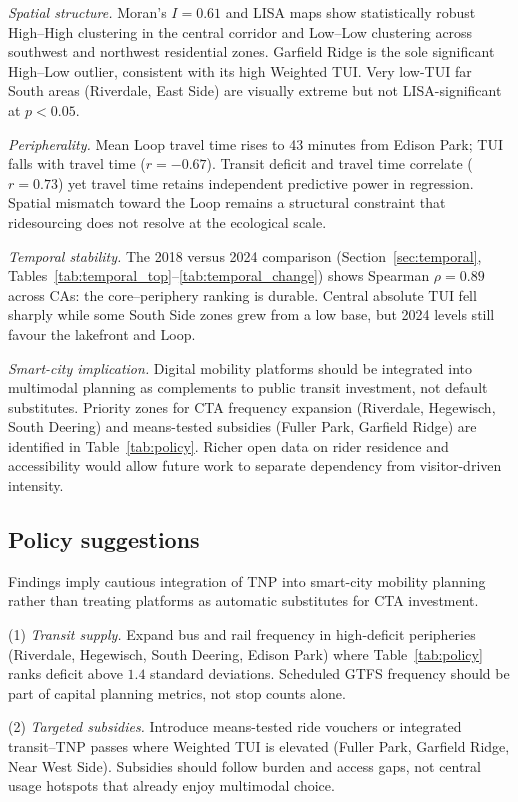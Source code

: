 \documentclass[10pt, a4paper]{article}
\begin{document}
\textit{Spatial structure.} Moran's $I=0.61$ and LISA maps show statistically robust High--High clustering in the central corridor and Low--Low clustering across southwest and northwest residential zones. Garfield Ridge is the sole significant High--Low outlier, consistent with its high Weighted TUI. Very low-TUI far South areas (Riverdale, East Side) are visually extreme but not LISA-significant at $p<0.05$.

\textit{Peripherality.} Mean Loop travel time rises to 43 minutes from Edison Park; TUI falls with travel time ($r=-0.67$). Transit deficit and travel time correlate ($r=0.73$) yet travel time retains independent predictive power in regression. Spatial mismatch toward the Loop remains a structural constraint that ridesourcing does not resolve at the ecological scale.

\textit{Temporal stability.} The 2018 versus 2024 comparison (Section~\ref{sec:temporal}, Tables~\ref{tab:temporal_top}--\ref{tab:temporal_change}) shows Spearman $\rho=0.89$ across CAs: the core--periphery ranking is durable. Central absolute TUI fell sharply while some South Side zones grew from a low base, but 2024 levels still favour the lakefront and Loop.

\textit{Smart-city implication.} Digital mobility platforms should be integrated into multimodal planning as complements to public transit investment, not default substitutes. Priority zones for CTA frequency expansion (Riverdale, Hegewisch, South Deering) and means-tested subsidies (Fuller Park, Garfield Ridge) are identified in Table~\ref{tab:policy}. Richer open data on rider residence and accessibility would allow future work to separate dependency from visitor-driven intensity.

\subsection{Policy suggestions}
Findings imply cautious integration of TNP into smart-city mobility planning rather than treating platforms as automatic substitutes for CTA investment.

(1) \textit{Transit supply.} Expand bus and rail frequency in high-deficit peripheries (Riverdale, Hegewisch, South Deering, Edison Park) where Table~\ref{tab:policy} ranks deficit above $1.4$ standard deviations. Scheduled GTFS frequency should be part of capital planning metrics, not stop counts alone.

(2) \textit{Targeted subsidies.} Introduce means-tested ride vouchers or integrated transit--TNP passes where Weighted TUI is elevated (Fuller Park, Garfield Ridge, Near West Side). Subsidies should follow burden and access gaps, not central usage hotspots that already enjoy multimodal choice.
\end{document}
